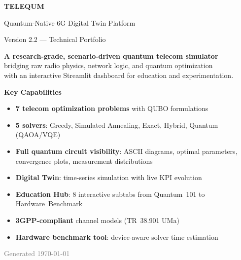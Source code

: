 \documentclass[11pt,a4paper]{article}
\begin{document}
\begin{titlepage}
\centering
\vspace*{3cm}
{\Huge\bfseries\textcolor{telequm}{TELEQUM} \par}
\vspace{0.3cm}
{\Large\textcolor{telequm!70}{Quantum-Native 6G Digital Twin Platform}\par}
\vspace{0.8cm}
{\large Version 2.2 — Technical Portfolio\par}
\vspace{2cm}

\begin{tcolorbox}[enhanced, colback=telequm!5, colframe=telequm!40,
  width=0.85\textwidth, arc=5pt, boxrule=0.6pt]
\centering
\textbf{A research-grade, scenario-driven quantum telecom simulator}\\[4pt]
bridging raw radio physics, network logic, and quantum optimization\\
with an interactive Streamlit dashboard for education and experimentation.
\end{tcolorbox}

\vspace{2cm}
{\large\textbf{Key Capabilities}\par}
\vspace{0.5cm}
\begin{minipage}{0.85\textwidth}
\begin{itemize}[leftmargin=1.5em]
  \item \textbf{7 telecom optimization problems} with QUBO formulations
  \item \textbf{5 solvers}: Greedy, Simulated Annealing, Exact, Hybrid, Quantum (QAOA/VQE)
  \item \textbf{Full quantum circuit visibility}: ASCII diagrams, optimal parameters, convergence plots, measurement distributions
  \item \textbf{Digital Twin}: time-series simulation with live KPI evolution
  \item \textbf{Education Hub}: 8 interactive subtabs from Quantum~101 to Hardware~Benchmark
  \item \textbf{3GPP-compliant} channel models (TR~38.901 UMa)
  \item \textbf{Hardware benchmark tool}: device-aware solver time estimation
\end{itemize}
\end{minipage}

\vfill
{\small\textcolor{gray}{Generated \today}\par}
\end{titlepage}
\end{document}
